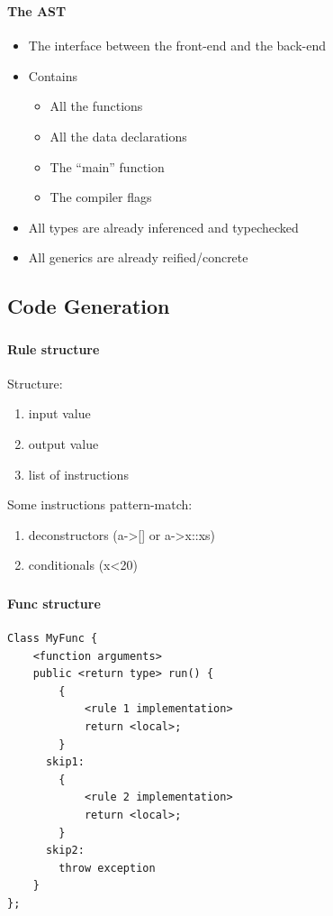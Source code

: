 \begin{frame}
    \frametitle{\subsecname}
    \framesubtitle{The AST}
    \begin{itemize}
    \item The interface between the front-end and the back-end
    \item Contains
        \begin{itemize}
        \item All the functions
        \item All the data declarations
        \item The “main” function
        \item The compiler flags
        \end{itemize}
    \item All types are already inferenced and typechecked
    \item All generics are already reified/concrete
    \end{itemize}
\end{frame}

\subsection{Code Generation}

\begin{frame}[fragile]
    \frametitle{\subsecname}
    \framesubtitle{Rule structure}
    Structure:
    \begin{enumerate}
        \item input value
        \item output value
        \item list of instructions
    \end{enumerate}
    Some instructions pattern-match:
    \begin{enumerate}
        \item deconstructors (a->[] or a->x::xs)
        \item conditionals (x<20)
    \end{enumerate}
\end{frame}

\begin{frame}[fragile]
    \frametitle{\subsecname}
    \framesubtitle{Func structure}
    \begin{lstlisting}
Class MyFunc {
    <function arguments>
    public <return type> run() {
        {
            <rule 1 implementation>
            return <local>;
        }
      skip1:
        {
            <rule 2 implementation>
            return <local>;
        }
      skip2:
        throw exception
    }
};
    \end{lstlisting}
\end{frame}

